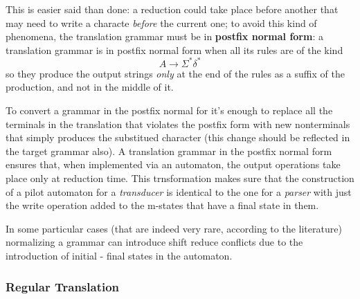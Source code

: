 				This is easier said than done: a reduction could take place before another that may need to write a characte \emph{before} the current one; to avoid 
				this kind of phenomena, the translation grammar must be in \textbf{postfix normal form}: a translation grammar is in postfix normal form when all its 
				rules are of the kind
				\begin{equation}
					A \rightarrow \Sigma^\ast \delta^\ast
				\end{equation} 
				so they produce the output strings \emph{only} at the end of the rules as a suffix of the production, and not in the middle of it.

				To convert a grammar in the postfix normal for it's enough to replace all the terminals in the translation that violates the postfix form with new 
				nonterminals that simply produces the substitued character (this change should be reflected in the target grammar also). A translation grammar in 
				the postfix normal form ensures that, when implemented via an automaton, the output operations take place only at reduction time. This trnsformation 
				makes sure that the construction of a pilot automaton for a \emph{transducer} is identical to the one for a \emph{parser} with just the write 
				operation added to the m-states that have a final state in them.

				In some particular cases (that are indeed very rare, according to the literature) normalizing a grammar can introduce shift reduce conflicts due to 
				the introduction of initial - final states in the automaton.
			
			\subsubsection{Regular Translation}
